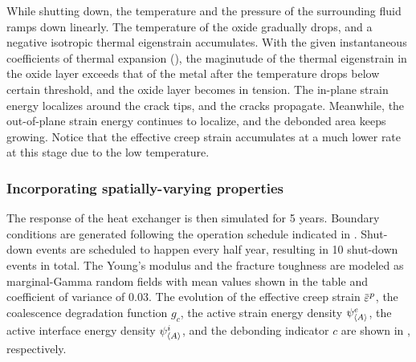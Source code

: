 

While shutting down, the temperature and the pressure of the surrounding fluid ramps down linearly. The temperature of the oxide gradually drops, and a negative isotropic thermal eigenstrain accumulates. With the given instantaneous coefficients of thermal expansion (), the maginutude of the thermal eigenstrain in the oxide layer exceeds that of the metal after the temperature drops below certain threshold, and the oxide layer becomes in tension. The in-plane strain energy localizes around the crack tips, and the cracks propagate. Meanwhile, the out-of-plane strain energy continues to localize, and the debonded area keeps growing. Notice that the effective creep strain accumulates at a much lower rate at this stage due to the low temperature.

\subsubsection{Incorporating spatially-varying properties}

The response of the heat exchanger is then simulated for 5 years. Boundary conditions are generated following the operation schedule indicated in . Shut-down events are scheduled to happen every half year, resulting in 10 shut-down events in total. The Young's modulus and the fracture toughness are modeled as marginal-Gamma random fields with mean values shown in the table  and coefficient of variance of $0.03$.
The evolution of the effective creep strain $\ep$, the coalescence degradation function $g_c$, the active strain energy density $\psi^e_{\left< A \right>}$, the active interface energy density $\psi^i_{\left< A \right>}$, and the debonding indicator $c$ are shown in , respectively.

